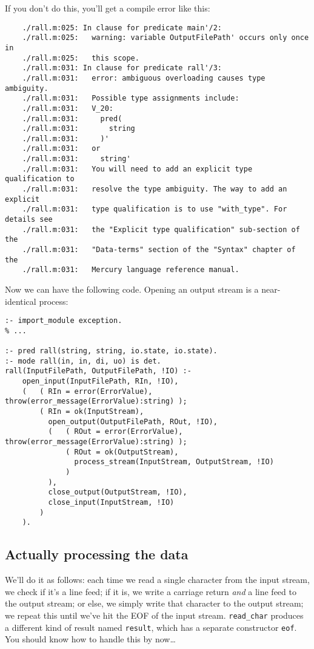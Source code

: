 If you don't do this, you'll get a compile error like this:

\begin{lstlisting}
	./rall.m:025: In clause for predicate main'/2:
	./rall.m:025:   warning: variable OutputFilePath' occurs only once in
	./rall.m:025:   this scope.
	./rall.m:031: In clause for predicate rall'/3:
	./rall.m:031:   error: ambiguous overloading causes type ambiguity.
	./rall.m:031:   Possible type assignments include:
	./rall.m:031:   V_20:
	./rall.m:031:     pred(
	./rall.m:031:       string
	./rall.m:031:     )'
	./rall.m:031:   or
	./rall.m:031:     string'
	./rall.m:031:   You will need to add an explicit type qualification to
	./rall.m:031:   resolve the type ambiguity. The way to add an explicit
	./rall.m:031:   type qualification is to use "with_type". For details see
	./rall.m:031:   the "Explicit type qualification" sub-section of the
	./rall.m:031:   "Data-terms" section of the "Syntax" chapter of the
	./rall.m:031:   Mercury language reference manual.
\end{lstlisting}

Now we can have the following code. Opening an output stream is a near-identical process:
\begin{lstlisting}[language=Mercury]
% throw/1 requires module `exception`.
:- import_module exception.
% ...

:- pred rall(string, string, io.state, io.state).
:- mode rall(in, in, di, uo) is det.
rall(InputFilePath, OutputFilePath, !IO) :-
    open_input(InputFilePath, RIn, !IO),
    (   ( RIn = error(ErrorValue), throw(error_message(ErrorValue):string) );
        ( RIn = ok(InputStream),
          open_output(OutputFilePath, ROut, !IO),
          (   ( ROut = error(ErrorValue), throw(error_message(ErrorValue):string) );
              ( ROut = ok(OutputStream),
                process_stream(InputStream, OutputStream, !IO)
              )
          ),
          close_output(OutputStream, !IO),
          close_input(InputStream, !IO)
        )
    ).
  \end{lstlisting}
  
\subsection{Actually processing the data}
\label{sec:orgcaacecd}

We'll do it as follows: each time we read a single character from the input stream, we check if it's a line feed; if it is, we write a carriage return \emph{and} a line feed to the output stream; or else, we simply write that character to the output stream; we repeat this until we've hit the EOF of the input stream. \texttt{read\_char} produces a different kind of result named \texttt{result}, which has a separate constructor \texttt{eof}. You should know how to handle this by now\ldots{}

